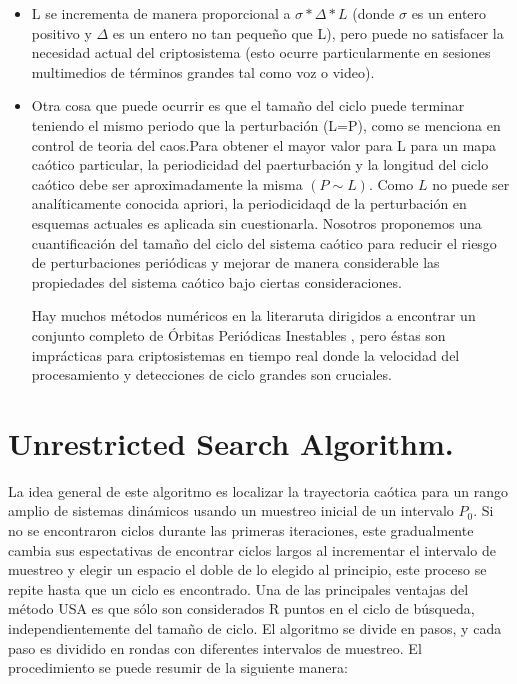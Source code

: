 \documentclass[10pt]{IEEEtran}
\begin{document}
\begin{itemize}
\item L se incrementa de manera proporcional a $\sigma*\Delta*L$ (donde $\sigma$ es un entero positivo y $\Delta$ es un entero no tan pequeño que L), pero puede no satisfacer la necesidad actual del criptosistema (esto ocurre particularmente en sesiones multimedios de términos grandes tal como voz o video).
\item Otra cosa que puede ocurrir es que el tamaño del ciclo puede terminar teniendo el mismo periodo que la perturbación (L=P), como se menciona en control de teoria del caos.Para obtener el mayor valor para L para un mapa caótico particular, la periodicidad del paerturbación y la longitud del ciclo caótico debe ser aproximadamente la misma $(P \sim L)$. Como $L$ no puede ser analíticamente conocida apriori, la periodicidaqd de la perturbación en esquemas actuales es aplicada sin cuestionarla. Nosotros proponemos una cuantificación del tamaño del ciclo del sistema caótico para reducir el riesgo de perturbaciones periódicas y mejorar de manera considerable las propiedades del sistema caótico bajo ciertas consideraciones.

Hay muchos métodos numéricos en la literaruta dirigidos a encontrar un conjunto completo de Órbitas Periódicas Inestables , pero éstas son imprácticas para criptosistemas en tiempo real donde la velocidad del procesamiento y detecciones de ciclo grandes son cruciales. 
\end{itemize}


\section{Unrestricted Search Algorithm.}
La idea general de este algoritmo es localizar la trayectoria caótica para un rango amplio de sistemas dinámicos usando un muestreo inicial de un intervalo $P_{0}$. Si no se encontraron ciclos durante las primeras iteraciones, este gradualmente cambia sus espectativas de encontrar ciclos largos al incrementar el intervalo de muestreo y elegir un espacio el doble de lo elegido al principio, este proceso se repite hasta que un ciclo es encontrado.  Una de las principales ventajas del método USA es que  sólo son considerados R puntos en el ciclo de búsqueda, independientemente del tamaño de ciclo. El algoritmo se divide en pasos, y cada paso es dividido en rondas con diferentes intervalos de muestreo. El procedimiento se puede resumir de la siguiente manera:
\end{document}

